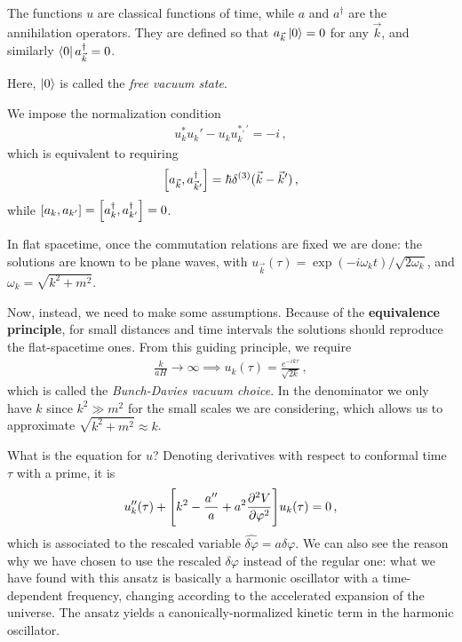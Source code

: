 \documentclass[main.tex]{subfiles}
\begin{document}
The functions \(u\) are classical functions of time, while \(a\) and \(a ^\dag \) are the annihilation operators.
They are defined so that \(a_{\vec{k}} \ket{0} = 0\) for any \(\vec{k}\), and similarly \(\bra{0} a ^\dag_{\vec{k}} = 0\). 

Here, \(\ket{0}\) is called the \emph{free vacuum state}.

We impose the normalization condition 
%
\begin{align}
u_k^{*} u_k' - u_k u_k^{*, \prime} = -i
\,,
\end{align}
%
which is equivalent to requiring 
%
\begin{align}
\qty[a_{\vec{k}}, a_{\vec{k}'} ^\dag] = \hbar \delta^{(3)} (\vec{k} - \vec{k}')
\,,
\end{align}
%
while \(\qty[a_k, a_{k'}] = \qty[a_k ^\dag, a_{k'}^\dag] = 0\). 

In flat spacetime, once the commutation relations are fixed we are done: the solutions are known to be plane waves, with \(u_{\vec{k}}(\tau ) = \exp(- i \omega _k t) / \sqrt{2 \omega _k}\), and \(\omega _k = \sqrt{k^2 + m^2}\). 

Now, instead, we need to make some assumptions. Because of the \textbf{equivalence principle}, for small distances and time intervals the solutions should reproduce the flat-spacetime ones. 
From this guiding principle, we require 
%
\begin{align}
\frac{k}{aH} \to \infty \implies 
u_k (\tau ) = \frac{e^{-i k \tau }}{\sqrt{2 k}}
\,,
\end{align}
%
which is called the \emph{Bunch-Davies vacuum choice}.
In the denominator we only have \(k\) since \(k^2\gg m^2\) for the small scales we are considering, which allows us to approximate \(\sqrt{k^2 + m^2 } \approx k\). 

What is the equation for \(u\)? Denoting derivatives with respect to conformal time \(\tau \) with a prime, it is 
%
\begin{align}
u''_k (\tau ) + \qty[k^2  - \frac{a''}{a} + a^2 \pdv[2]{V}{\varphi }] u_k (\tau ) = 0
\,,
\end{align}
%
which is associated to the rescaled variable \( \hat{ \delta \varphi} = a \delta \varphi \). 
We can also see the reason why we have chosen to use the rescaled \(\delta \varphi \) instead of the regular one: what we have found with this ansatz is basically a harmonic oscillator with a time-dependent frequency, changing according to the accelerated expansion of the universe. 
The ansatz yields a canonically-normalized kinetic term in the harmonic oscillator. 
\end{document}
